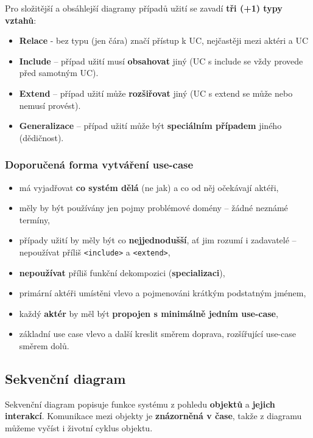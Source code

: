 \noindent Pro složitější a obsáhlejší diagramy případů užití se zavadí \textbf{tři (+1) typy vztahů}:
\begin{itemize}
    \item \textbf{Relace} - bez typu (jen čára) značí přístup k UC, nejčastěji mezi aktéri a UC
\item \textbf{Include} – případ užití musí \textbf{obsahovat} jiný (UC s include se vždy provede před samotným UC).
\item \textbf{Extend} – případ užití může \textbf{rozšiřovat} jiný (UC s extend se může nebo nemusí provést).
\item \textbf{Generalizace} – případ užití může být \textbf{speciálním případem} jiného (dědičnost).
\end{itemize}

\subsubsection{Doporučená forma vytváření use-case}
\begin{itemize}
\item má vyjadřovat \textbf{co systém dělá} (ne jak) a co od něj očekávají aktéři,
\item měly by být používány jen pojmy problémové domény -- žádné neznámé termíny,
\item případy užití by měly být co \textbf{nejjednodušší}, ať jim rozumí i zadavatelé -- nepoužívat příliš \texttt{<include>} a \texttt{<extend>},
\item \textbf{nepoužívat} příliš funkční dekompozici (\textbf{specializaci}),
\item primární aktéři umístěni vlevo a pojmenováni krátkým podstatným jménem,
\item každý \textbf{aktér} by měl být \textbf{propojen s minimálně jedním use-case},
\item základní use case vlevo a další kreslit směrem doprava, rozšířující use-case směrem dolů.
\end{itemize}

\subsection{Sekvenční diagram}
Sekvenční diagram popisuje funkce systému z pohledu \textbf{objektů} a\textbf{ jejich interakcí}. Komunikace mezi objekty je \textbf{znázorněná v čase}, takže z diagramu můžeme vyčíst i životní cyklus objektu. 

